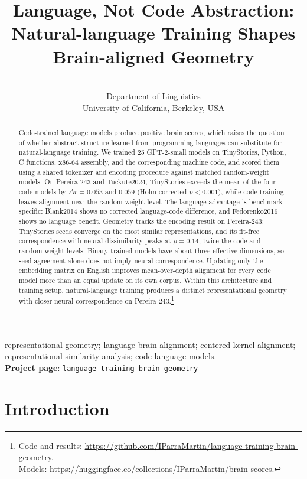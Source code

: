 \documentclass[mlmain]{jmlr}
\author{\Name{I\~nigo Parra} \Email{iparra@berkeley.edu} \\
       \addr Department of Linguistics \\ University of California, Berkeley, USA}
\title[Natural-language Training Shapes Brain-aligned Geometry]{Language, Not Code Abstraction: Natural-language Training Shapes Brain-aligned Geometry}
\begin{document}
\maketitle

\begin{abstract}
Code-trained language models produce positive brain scores, which raises the question of whether abstract structure learned from programming languages can substitute for natural-language training. We trained 25 GPT-2-small models on TinyStories, Python, C functions, x86-64 assembly, and the corresponding machine code, and scored them using a shared tokenizer and encoding procedure against matched random-weight models. On Pereira-243 and Tuckute2024, TinyStories exceeds the mean of the four code models by $\Delta r = 0.053$ and $0.059$ (Holm-corrected $p<0.001$), while code training leaves alignment near the random-weight level. The language advantage is benchmark-specific: Blank2014 shows no corrected language-code difference, and Fedorenko2016 shows no language benefit. Geometry tracks the encoding result on Pereira-243: TinyStories seeds converge on the most similar representations, and its fit-free correspondence with neural dissimilarity peaks at $\rho = 0.14$, twice the code and random-weight levels. Binary-trained models have about three effective dimensions, so seed agreement alone does not imply neural correspondence. Updating only the embedding matrix on English improves mean-over-depth alignment for every code model more than an equal update on its own corpus. Within this architecture and training setup, natural-language training produces a distinct representational geometry with closer neural correspondence on Pereira-243.\footnote{Code and results: \url{https://github.com/IParraMartin/language-training-brain-geometry}. \\ Models: \url{https://huggingface.co/collections/IParraMartin/brain-scores}.}
\end{abstract}

\begin{keywords}
representational geometry; language-brain alignment; centered kernel alignment; representational similarity analysis; code language models.\\
\noindent \textbf{Project page}: \href{https://iparramartin.github.io/language-training-brain-geometry/}{\texttt{language-training-brain-geometry}}
\end{keywords}


\section{Introduction}
\label{sec:intro}
\end{document}
